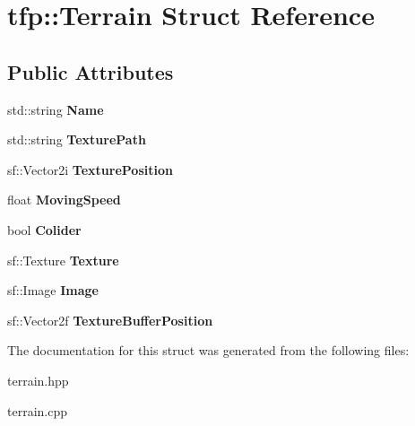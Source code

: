 \hypertarget{structtfp_1_1_terrain}{}\section{tfp\+:\+:Terrain Struct Reference}
\label{structtfp_1_1_terrain}
\subsection*{Public Attributes}
\begin{DoxyCompactItemize}
\item 
\mbox{\label{structtfp_1_1_terrain_ad28afeddf105e4d2d51323e187361fcc}} 
std\+::string {\bfseries Name}
\item 
\mbox{\label{structtfp_1_1_terrain_a39e4849f37bc2464ef8648ee49874da4}} 
std\+::string {\bfseries Texture\+Path}
\item 
\mbox{\label{structtfp_1_1_terrain_a2883c582cb4aa42226e73fcc95bdf474}} 
sf\+::\+Vector2i {\bfseries Texture\+Position}
\item 
\mbox{\label{structtfp_1_1_terrain_a36945b6d747b48979ec54c26183a8e6b}} 
float {\bfseries Moving\+Speed}
\item 
\mbox{\label{structtfp_1_1_terrain_a151b4a8f62960139d30f4a2e15af36ac}} 
bool {\bfseries Colider}
\item 
\mbox{\label{structtfp_1_1_terrain_aaac5a42533486760741f3b7fed5d05b9}} 
sf\+::\+Texture {\bfseries Texture}
\item 
\mbox{\label{structtfp_1_1_terrain_a4dd6835f4a62aab21c73fb0b7e014eea}} 
sf\+::\+Image {\bfseries Image}
\item 
\mbox{\label{structtfp_1_1_terrain_a0968ba806944686d029e44b8613541ce}} 
sf\+::\+Vector2f {\bfseries Texture\+Buffer\+Position}
\end{DoxyCompactItemize}


The documentation for this struct was generated from the following files\+:\begin{DoxyCompactItemize}
\item 
terrain.\+hpp\item 
terrain.\+cpp\end{DoxyCompactItemize}
